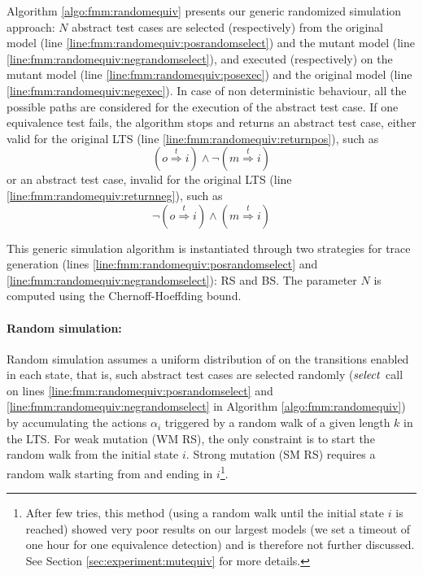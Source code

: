 Algorithm \ref{algo:fmm:randomequiv} presents our generic randomized simulation approach: $N$ abstract test cases are selected (respectively) from the original model (line \ref{line:fmm:randomequiv:posrandomselect}) and the mutant model (line \ref{line:fmm:randomequiv:negrandomselect}), and executed (respectively) on the mutant model (line \ref{line:fmm:randomequiv:posexec}) and the original model (line \ref{line:fmm:randomequiv:negexec}).  In case of non deterministic behaviour, all the possible paths are considered for the execution of the abstract test case. If one equivalence test fails, the algorithm stops and returns an abstract test case, either valid for the original LTS (line \ref{line:fmm:randomequiv:returnpos}), such as 
$$(o \overset{t}{\Longrightarrow}i) \wedge \neg (m \overset{t}{\Longrightarrow}i)$$ 
or an abstract test case, invalid for the original LTS (line \ref{line:fmm:randomequiv:returnneg}), such as 
$$\neg (o \overset{t}{\Longrightarrow}i) \wedge (m \overset{t}{\Longrightarrow}i)$$

This generic simulation algorithm is instantiated through two strategies for trace generation (lines \ref{line:fmm:randomequiv:posrandomselect} and \ref{line:fmm:randomequiv:negrandomselect}): \acrfull{RS} and \acrfull{BS}. The parameter $N$ is computed using the Chernoff-Hoeffding bound.

\paragraph{Random simulation:}

Random simulation assumes a uniform distribution of on the transitions enabled in each state, that is, such abstract test cases are selected randomly ($\mathit{select}$ call on lines \ref{line:fmm:randomequiv:posrandomselect} and \ref{line:fmm:randomequiv:negrandomselect} in Algorithm \ref{algo:fmm:randomequiv}) by accumulating the actions $\alpha_i$ triggered by a random walk of a given length $k$ in the LTS. For weak mutation (\gls{WM} \gls{RS}), the only constraint is to start the random walk from the initial state $i$. Strong mutation (\gls{SM} \gls{RS}) requires a random walk starting from and ending in $i$\footnote{After few tries, this method (\ie using a random walk until the initial state $i$ is reached) showed very poor results on our largest models (we set a timeout of one hour for one equivalence detection) and is therefore not further discussed. See Section \ref{sec:experiment:mutequiv} for more details.}.


